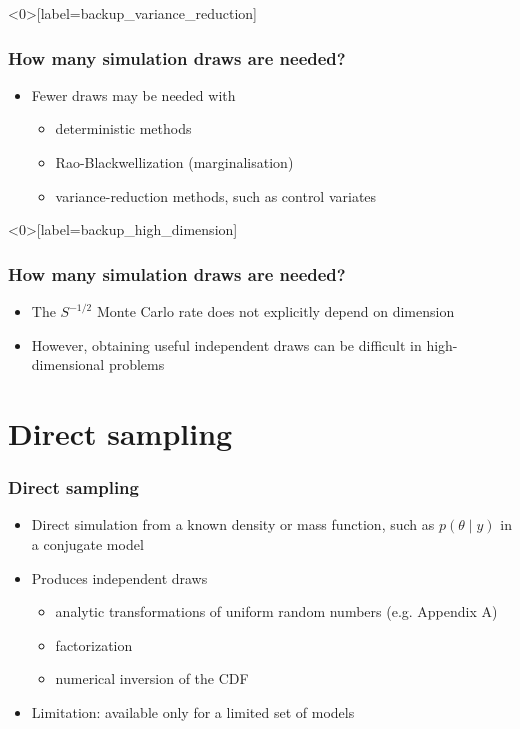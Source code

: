 \documentclass[10pt]{beamer}
\begin{document}
\begin{frame}<0>[label=backup_variance_reduction]

\frametitle{How many simulation draws are needed?}

  \begin{itemize}
  \item Fewer draws may be needed with
    \begin{itemize}
    \item deterministic methods
    \item Rao-Blackwellization (marginalisation)
    \item variance-reduction methods, such as control variates
    \end{itemize}
  \end{itemize}

\end{frame}

\begin{frame}<0>[label=backup_high_dimension]

\frametitle{How many simulation draws are needed?}

  \begin{itemize}
  \item The $S^{-1/2}$ Monte Carlo rate does not explicitly depend on dimension
\pause
    \item However, obtaining useful independent draws can be difficult in
      high-dimensional problems

  \end{itemize}

\end{frame}

\section{Direct sampling}

\begin{frame}
\frametitle{Direct sampling}

  \begin{itemize}
  \item Direct simulation from a known density or mass function, such as
    $p(\theta\mid y)$ in a conjugate model
  \item Produces independent draws
    \begin{itemize}
    \item analytic transformations of uniform random numbers
      (e.g. Appendix A)
    \item factorization
    \item numerical inversion of the CDF
    \end{itemize}
  \item {\color{uured}Limitation}: available only for a limited set of models
  \end{itemize}

\end{frame}
\end{document}
